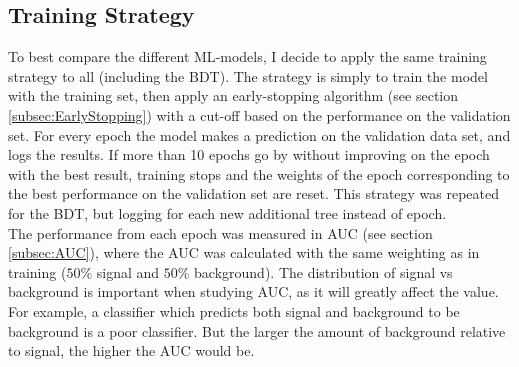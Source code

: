 \subsection{Training Strategy}\label{subsec:TrainingStrategy}
To best compare the different \ac{ML}-models, I decide to apply the same training strategy to all (including the \ac{BDT}). The strategy is simply to train the model 
with the training set, then apply an early-stopping algorithm (see section \ref{subsec:EarlyStopping}) with a cut-off based on the performance on the validation set. For 
every epoch the model makes a prediction on the validation data set, and logs the results. If more than 10 epochs go by without improving on the epoch with the best result,
training stops and the weights of the epoch corresponding to the best performance on the validation set are reset. This strategy was repeated for the \ac{BDT}, but logging 
for each new additional tree instead of epoch.
\\
The performance from each epoch was measured in \ac{AUC} (see section \ref{subsec:AUC}), where the \ac{AUC} was calculated with the same weighting as in training ($50\%$ signal
and $50\%$ background). The distribution of signal vs background is important when studying \ac{AUC}, as it will greatly affect the value. For example, a classifier which predicts 
both signal and background to be background is a poor classifier. But the larger the amount of background relative to signal, the higher the \ac{AUC} would be. 